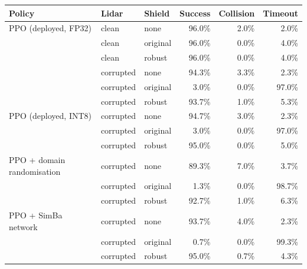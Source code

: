 \begin{tabular}{lllrrr}
\toprule
Policy & Lidar & Shield & Success & Collision & Timeout \\
\midrule
PPO (deployed, FP32) & clean & none & 96.0\% & 2.0\% & 2.0\% \\
 & clean & original & 96.0\% & 0.0\% & 4.0\% \\
 & clean & robust & 96.0\% & 0.0\% & 4.0\% \\
 & corrupted & none & 94.3\% & 3.3\% & 2.3\% \\
 & corrupted & original & 3.0\% & 0.0\% & 97.0\% \\
 & corrupted & robust & 93.7\% & 1.0\% & 5.3\% \\
PPO (deployed, INT8) & corrupted & none & 94.7\% & 3.0\% & 2.3\% \\
 & corrupted & original & 3.0\% & 0.0\% & 97.0\% \\
 & corrupted & robust & 95.0\% & 0.0\% & 5.0\% \\
PPO + domain randomisation & corrupted & none & 89.3\% & 7.0\% & 3.7\% \\
 & corrupted & original & 1.3\% & 0.0\% & 98.7\% \\
 & corrupted & robust & 92.7\% & 1.0\% & 6.3\% \\
PPO + SimBa network & corrupted & none & 93.7\% & 4.0\% & 2.3\% \\
 & corrupted & original & 0.7\% & 0.0\% & 99.3\% \\
 & corrupted & robust & 95.0\% & 0.7\% & 4.3\% \\
\bottomrule
\end{tabular}
